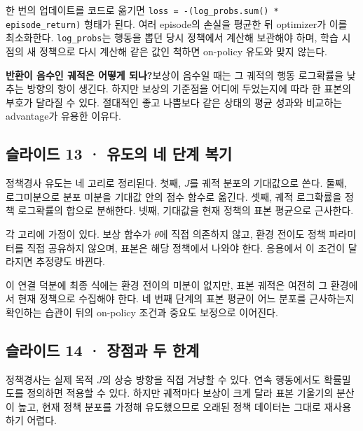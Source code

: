 \documentclass[11pt,a4paper]{article}
\begin{document}
한 번의 업데이트를 코드로 옮기면 \texttt{loss = -(log\_\allowbreak{}probs.\allowbreak{}sum() * episode\_\allowbreak{}return)} 형태가 된다. 여러 episode의 손실을 평균한 뒤 optimizer가 이를 최소화한다. \texttt{log\_\allowbreak{}probs}는 행동을 뽑던 당시 정책에서 계산해 보관해야 하며, 학습 시점의 새 정책으로 다시 계산해 같은 값인 척하면 on-policy 유도와 맞지 않는다.\par

\par\medskip\noindent\textbf{반환이 음수인 궤적은 어떻게 되나?}\quad 보상이 음수일 때는 그 궤적의 행동 로그확률을 낮추는 방향의 항이 생긴다. 하지만 보상의 기준점을 어디에 두었는지에 따라 한 표본의 부호가 달라질 수 있다. 절대적인 좋고 나쁨보다 같은 상태의 평균 성과와 비교하는 advantage가 유용한 이유다.\par

\subsection{슬라이드 13 · 유도의 네 단계 복기}

정책경사 유도는 네 고리로 정리된다. 첫째, $J$를 궤적 분포의 기대값으로 쓴다. 둘째, 로그미분으로 분포 미분을 기대값 안의 점수 함수로 옮긴다. 셋째, 궤적 로그확률을 정책 로그확률의 합으로 분해한다. 넷째, 기대값을 현재 정책의 표본 평균으로 근사한다.\par

각 고리에 가정이 있다. 보상 함수가 $\theta$에 직접 의존하지 않고, 환경 전이도 정책 파라미터를 직접 공유하지 않으며, 표본은 해당 정책에서 나와야 한다. 응용에서 이 조건이 달라지면 추정량도 바뀐다.\par

이 연결 덕분에 최종 식에는 환경 전이의 미분이 없지만, 표본 궤적은 여전히 그 환경에서 현재 정책으로 수집해야 한다. 네 번째 단계의 표본 평균이 어느 분포를 근사하는지 확인하는 습관이 뒤의 on-policy 조건과 중요도 보정으로 이어진다.\par

\subsection{슬라이드 14 · 장점과 두 한계}

정책경사는 실제 목적 $J$의 상승 방향을 직접 겨냥할 수 있다. 연속 행동에서도 확률밀도를 정의하면 적용할 수 있다. 하지만 궤적마다 보상이 크게 달라 표본 기울기의 분산이 높고, 현재 정책 분포를 가정해 유도했으므로 오래된 정책 데이터는 그대로 재사용하기 어렵다.\par
\end{document}
